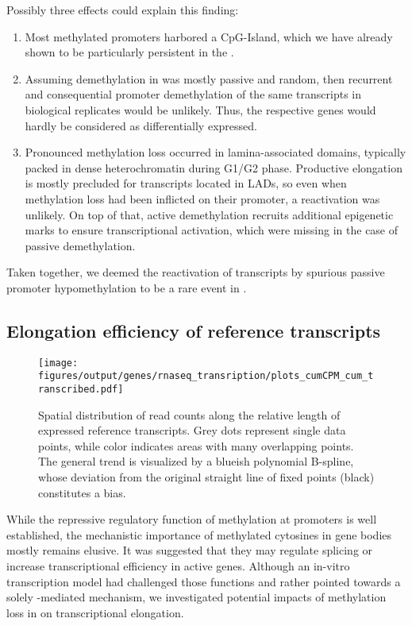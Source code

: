 Possibly three effects could explain this finding: 

\begin{enumerate}
	\item Most methylated promoters harbored a CpG-Island, which we have already shown to be particularly persistent in the \dnmtchip {}. 
	\item Assuming demethylation in \dnmtchip was mostly passive and random, then recurrent and consequential promoter demethylation of the same transcripts in biological replicates would be unlikely. Thus, the respective genes would hardly be considered as differentially expressed. 
	\item Pronounced methylation loss occurred in lamina-associated domains, typically packed in dense heterochromatin during G1/G2 phase. Productive elongation is mostly precluded for transcripts located in LADs\cite{Reddy2008,Leemans2019}, so even when methylation loss had been inflicted on their promoter, a reactivation was unlikely. On top of that, active demethylation recruits additional epigenetic marks to ensure transcriptional activation, which were missing in the case of passive demethylation\cite{Chen2013,Fujiki2011,Deplus2013}. 
\end{enumerate}

Taken together, we deemed the reactivation of transcripts by spurious passive promoter hypomethylation to be a rare event in \dnmtchip.

\FloatBarrier
\subsection{Elongation efficiency of reference transcripts} %
\label{chap:r:transcription:elongation}

\begin{figure}[!ht]
	\centering
	\texttt{[image: figures/output/genes/rnaseq\_transription/plots\_cumCPM\_cum\_transcribed.pdf]} 
	\caption{Spatial distribution of read counts along the relative length of expressed reference transcripts. Grey dots represent single data points, while color indicates areas with many overlapping points. The general trend is visualized by a blueish polynomial B-spline, whose deviation from the original straight line of fixed points (black) constitutes a bias.}
	\label{fig:plots_cumCPM_cum_transcribed}
\end{figure}

While the repressive regulatory function of methylation at promoters is well established, the mechanistic importance of methylated cytosines in gene bodies mostly remains elusive. It was suggested that they may regulate splicing\cite{Mendizabal2017} or increase transcriptional efficiency in active genes\cite{Aran2011}. Although an in-vitro transcription model had challenged those functions and rather pointed towards a solely \histhirtysixthree-mediated mechanism\cite{Nanan2017}, we investigated potential impacts of methylation loss in \dnmtchip on transcriptional elongation. 

